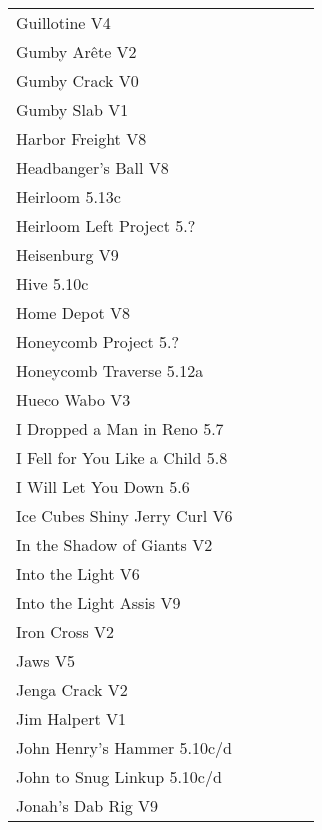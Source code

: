 \begin{flushleft}
\begin{center}
\begin{supertabular}{p{0.76\linewidth}p{0.08\linewidth}}
Guillotine V4 & \pageref{rt:Guillotine} \\
Gumby Arête V2 & \pageref{rt:Gumby Arête} \\
Gumby Crack V0 & \pageref{rt:Gumby Crack} \\
Gumby Slab V1 & \pageref{rt:Gumby Slab} \\
Harbor Freight V8 & \pageref{vr:Harbor Freight} \\
Headbanger's Ball V8 & \pageref{rt:Hanging Prow Project} \\
Heirloom 5.13c & \pageref{rt:Heirloom} \\
Heirloom Left Project 5.? & \pageref{vr:Heirloom Left Project} \\
Heisenburg V9 & \pageref{rt:Heisenburg} \\
Hive 5.10c & \pageref{rt:Hive} \\
Home Depot V8 & \pageref{vr:Harbor Freight Right Exit} \\
Honeycomb Project 5.? & \pageref{rt:Honeycomb Project} \\
Honeycomb Traverse 5.12a & \pageref{vr:Honeycomb Traverse} \\
Hueco Wabo V3 & \pageref{rt:Hueco Wabo} \\
I Dropped a Man in Reno 5.7 & \pageref{rt:I Dropped a Man in Reno} \\
I Fell for You Like a Child 5.8 & \pageref{rt:I Fell for You Like a Child} \\
I Will Let You Down 5.6 & \pageref{rt:I Will Let You Down} \\
Ice Cubes Shiny Jerry Curl V6 & \pageref{rt:Ice Cubes Shiny Jerry Curl} \\
In the Shadow of Giants V2 & \pageref{rt:In the Shadow of Giants} \\
Into the Light V6 & \pageref{rt:Into the Light} \\
Into the Light Assis V9 & \pageref{vr:Into the Light Assis} \\
Iron Cross V2 & \pageref{vr:Iron Cross} \\
Jaws V5 & \pageref{rt:Jaws} \\
Jenga Crack V2 & \pageref{vr:Crack 2} \\
Jim Halpert V1 & \pageref{rt:Jim Halpert} \\
John Henry's Hammer 5.10c/d & \pageref{rt:John Henry's Hammer} \\
John to Snug Linkup 5.10c/d & \pageref{vr:John to Snug Linkup} \\
Jonah's Dab Rig V9 & \pageref{rt:Jonah's Dab Rig} \\

\end{supertabular}
\end{center}
\end{flushleft}
